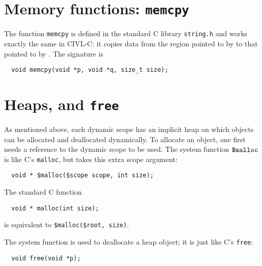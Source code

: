 \section{Memory functions: \texttt{memcpy}}

The function \texttt{memcpy} is defined in the standard C library
\texttt{string.h} and works exactly the same in CIVL-C: it copies
data from the region pointed to by  to that pointed to by
.  The signature is

\begin{verbatim}
  void memcpy(void *p, void *q, size_t size);
\end{verbatim}

\section{Heaps, \cmalloc{} and \texttt{free}}

As mentioned above, each dynamic scope has an implicit heap on which
objects can be allocated and deallocated dynamically.  To allocate an
object, one first needs a reference to the dynamic scope to be used.
The system function $\mbox{\texttt{\${}malloc}}$ is like C's \texttt{malloc}, but takes
this extra scope argument:
\begin{verbatim}
  void * $malloc($scope scope, int size);
\end{verbatim}
The standard C function
\begin{verbatim}
  void * malloc(int size);
\end{verbatim}
is equivalent to \verb!$malloc($root, size)!.

The system function  is used to deallocate a heap object;
it is just like C's \texttt{free}:
\begin{verbatim}
  void free(void *p);
\end{verbatim}




